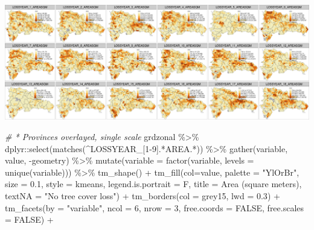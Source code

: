 \documentclass[10pt,landscape,a3paper]{article}
\newenvironment{Shaded}{\begin{snugshade}}{\end{snugshade}}
\newcommand{\AttributeTok}[1]{\textcolor[rgb]{0.77,0.63,0.00}{#1}}
\newcommand{\CommentTok}[1]{\textcolor[rgb]{0.56,0.35,0.01}{\textit{#1}}}
\newcommand{\ConstantTok}[1]{\textcolor[rgb]{0.00,0.00,0.00}{#1}}
\newcommand{\DecValTok}[1]{\textcolor[rgb]{0.00,0.00,0.81}{#1}}
\newcommand{\FloatTok}[1]{\textcolor[rgb]{0.00,0.00,0.81}{#1}}
\newcommand{\FunctionTok}[1]{\textcolor[rgb]{0.00,0.00,0.00}{#1}}
\newcommand{\NormalTok}[1]{#1}
\newcommand{\SpecialCharTok}[1]{\textcolor[rgb]{0.00,0.00,0.00}{#1}}
\newcommand{\StringTok}[1]{\textcolor[rgb]{0.31,0.60,0.02}{#1}}
\begin{document}
\begin{center}\includegraphics{img/data-download-preparation-eda/zonal-long-term-grid-4} \end{center}

\begin{Shaded}
\begin{Highlighting}[]
\CommentTok{\# * Provinces overlayed, single scale}
\NormalTok{grdzonal }\SpecialCharTok{\%\textgreater{}\%}\NormalTok{ dplyr}\SpecialCharTok{::}\FunctionTok{select}\NormalTok{(}\FunctionTok{matches}\NormalTok{(}\StringTok{\textquotesingle{}\^{}LOSSYEAR\_[1{-}9].*AREA.*\textquotesingle{}}\NormalTok{)) }\SpecialCharTok{\%\textgreater{}\%}
  \FunctionTok{gather}\NormalTok{(variable, value, }\SpecialCharTok{{-}}\NormalTok{geometry) }\SpecialCharTok{\%\textgreater{}\%}
  \FunctionTok{mutate}\NormalTok{(}\AttributeTok{variable =} \FunctionTok{factor}\NormalTok{(variable, }\AttributeTok{levels =} \FunctionTok{unique}\NormalTok{(variable))) }\SpecialCharTok{\%\textgreater{}\%} 
  \FunctionTok{tm\_shape}\NormalTok{() }\SpecialCharTok{+}
  \FunctionTok{tm\_fill}\NormalTok{(}\AttributeTok{col=}\StringTok{\textquotesingle{}value\textquotesingle{}}\NormalTok{, }\AttributeTok{palette =} \StringTok{"YlOrBr"}\NormalTok{, }\AttributeTok{size =} \FloatTok{0.1}\NormalTok{,}
          \AttributeTok{style =} \StringTok{\textquotesingle{}kmeans\textquotesingle{}}\NormalTok{, }\AttributeTok{legend.is.portrait =}\NormalTok{ F, }\AttributeTok{title =} \StringTok{\textquotesingle{}Area (square meters)\textquotesingle{}}\NormalTok{,}
          \AttributeTok{textNA =} \StringTok{"No tree cover loss"}\NormalTok{) }\SpecialCharTok{+}
  \FunctionTok{tm\_borders}\NormalTok{(}\AttributeTok{col =} \StringTok{\textquotesingle{}grey15\textquotesingle{}}\NormalTok{, }\AttributeTok{lwd =} \FloatTok{0.3}\NormalTok{) }\SpecialCharTok{+}
  \FunctionTok{tm\_facets}\NormalTok{(}\AttributeTok{by =} \StringTok{"variable"}\NormalTok{, }\AttributeTok{ncol =} \DecValTok{6}\NormalTok{, }\AttributeTok{nrow =} \DecValTok{3}\NormalTok{, }\AttributeTok{free.coords =} \ConstantTok{FALSE}\NormalTok{, }\AttributeTok{free.scales =} \ConstantTok{FALSE}\NormalTok{) }\SpecialCharTok{+}

\end{Highlighting}
\end{Shaded}
\end{document}
